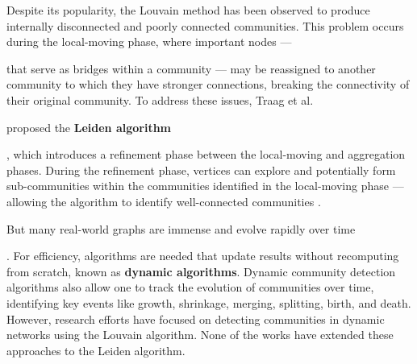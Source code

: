 Despite its popularity, the Louvain method has been observed to produce internally disconnected and poorly connected communities. This problem occurs during the local-moving phase, where important nodes --- that serve as bridges within a community --- may be reassigned to another community to which they have stronger connections, breaking the connectivity of their original community. To address these issues, Traag et al. \cite{com-traag19} proposed the \textbf{Leiden algorithm}, which introduces a refinement phase between the local-moving and aggregation phases. During the refinement phase, vertices can explore and potentially form sub-communities within the communities identified in the local-moving phase --- allowing the algorithm to identify well-connected communities \cite{com-traag19}.

But many real-world graphs are immense and evolve rapidly over time. For efficiency, algorithms are needed that update results without recomputing from scratch, known as \textbf{dynamic algorithms}. Dynamic community detection algorithms also allow one to track the evolution of communities over time, identifying key events like growth, shrinkage, merging, splitting, birth, and death. However, research efforts have focused on detecting communities in dynamic networks using the Louvain algorithm. None of the works have extended these approaches to the Leiden algorithm.

